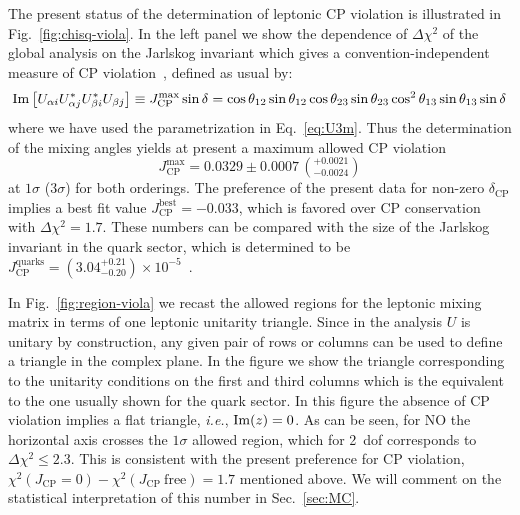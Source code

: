 \documentclass[a4paper, 11pt]{article}
\renewcommand{\Im}{\mathop{\rm Im}}
\begin{document}
The present status of the determination of leptonic CP violation is
illustrated in Fig.~\ref{fig:chisq-viola}. In the left panel we show
the dependence of $\Delta\chi^2$ of the global analysis on the
Jarlskog invariant which gives a convention-independent measure of CP
violation~\cite{Jarlskog:1985ht}, defined as usual by:
%
\begin{equation}
  \Im\big[ U_{\alpha i} U_{\alpha j}^* U_{\beta i}^* U_{\beta j} \big]
  \equiv J_\text{CP}^\text{max} \sin\delta =
  \cos\theta_{12} \sin\theta_{12}
  \cos\theta_{23} \sin\theta_{23} \cos^2\theta_{13} \sin\theta_{13}
  \sin\delta
\end{equation}
%
where we have used the parametrization in Eq.~\eqref{eq:U3m}.  Thus
the determination of the mixing angles yields at present a maximum
allowed CP violation
%
\begin{equation}
  \label{eq:jmax}
  J_\text{CP}^\text{max} = 0.0329 \pm 0.0007 \, (^{+0.0021}_{-0.0024})
\end{equation}
%
at $1\sigma$ ($3\sigma$) for both orderings.  The preference of the
present data for non-zero $\delta_\text{CP}$ implies a best fit value
$J_\text{CP}^\text{best} = -0.033$, which is favored over CP
conservation with $\Delta\chi^2 = 1.7$.  These numbers can be compared
with the size of the Jarlskog invariant in the quark sector, which is
determined to be $J_\text{CP}^\text{quarks} = (3.04^{+0.21}_{-0.20})
\times 10^{-5}$~\cite{PDG}.

In Fig.~\ref{fig:region-viola} we recast the allowed regions for the
leptonic mixing matrix in terms of one leptonic unitarity
triangle. Since in the analysis $U$ is unitary by construction, any
given pair of rows or columns can be used to define a triangle in the
complex plane. In the figure we show the triangle corresponding to the
unitarity conditions on the first and third columns which is the
equivalent to the one usually shown for the quark sector.  In this
figure the absence of CP violation implies a flat triangle,
\textit{i.e.}, $\Im(z) = 0$. As can be seen, for NO the horizontal
axis crosses the $1\sigma$ allowed region, which for 2~dof corresponds
to $\Delta\chi^2 \leq 2.3$. This is consistent with the present
preference for CP violation, $\chi^2(J_\text{CP} = 0) -
\chi^2(J_\text{CP}~\text{free}) = 1.7$ mentioned above. We will
comment on the statistical interpretation of this number in
Sec.~\ref{sec:MC}.
\end{document}
